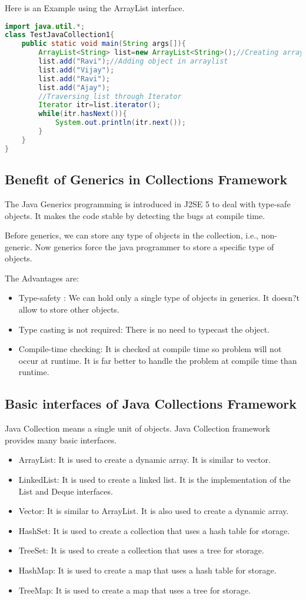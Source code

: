 \documentclass[11pt]{article}
\begin{document}
Here is an Example using the ArrayList interface. 

\begin{lstlisting}[language=Java]
import java.util.*;  
class TestJavaCollection1{  
	public static void main(String args[]){  
		ArrayList<String> list=new ArrayList<String>();//Creating arraylist  
		list.add("Ravi");//Adding object in arraylist  
		list.add("Vijay");  
		list.add("Ravi");  
		list.add("Ajay");  
		//Traversing list through Iterator  
		Iterator itr=list.iterator();  
		while(itr.hasNext()){  
			System.out.println(itr.next());  
		}  
	}  
}  
\end{lstlisting}
\subsection{Benefit of Generics in Collections Framework}
The Java Generics programming is introduced in J2SE 5 to deal with type-safe objects. It makes the code stable by detecting the bugs at compile time.

Before generics, we can store any type of objects in the collection, i.e., non-generic. Now generics force the java programmer to store a specific type of objects.

The Advantages are: 
\begin{itemize}
	\item Type-safety :  We can hold only a single type of objects in generics. It doesn?t allow to store other objects.
	\item Type casting is not required: There is no need to typecast the object.
	\item Compile-time checking: It is checked at compile time so problem will not occur at runtime. It is far better to handle the problem at compile time than runtime.
\end{itemize}
\subsection{Basic interfaces of Java Collections Framework}
Java Collection means a single unit of objects. Java Collection framework provides many basic interfaces.
\begin{itemize}
	\item ArrayList: It is used to create a dynamic array. It is similar to vector.
	\item LinkedList: It is used to create a linked list. It is the implementation of the List and Deque interfaces.
	\item Vector: It is similar to ArrayList. It is also used to create a dynamic array.
	\item HashSet: It is used to create a collection that uses a hash table for storage.
	\item TreeSet: It is used to create a collection that uses a tree for storage.
	\item HashMap: It is used to create a map that uses a hash table for storage.
	\item TreeMap: It is used to create a map that uses a tree for storage.

\end{itemize}
\end{document}
